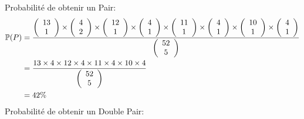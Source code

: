 Probabilité de obtenir un Pair:\\
\begin{align*}
    \mathbb{P}(P) &= \frac{{\left( \begin{array}{cc}13 \\ 1\end{array} \right)} \times {\left( \begin{array}{cc}4 \\ 2\end{array} \right)} \times {\left( \begin{array}{cc}12 \\ 1\end{array} \right)} \times {\left( \begin{array}{cc}4 \\ 1\end{array} \right)} \times {\left( \begin{array}{cc}11 \\ 1\end{array} \right)} \times {\left( \begin{array}{cc}4 \\ 1\end{array} \right)} \times {\left( \begin{array}{cc}10 \\ 1\end{array} \right)} \times {\left( \begin{array}{cc}4 \\ 1\end{array} \right)}}{{\left( \begin{array}{cc}52 \\ 5\end{array} \right)}}\\
    &= \frac{13 \times 4 \times 12 \times 4 \times 11 \times 4 \times 10 \times 4}{{\left( \begin{array}{cc}52 \\ 5\end{array} \right)}}\\
    &=42\%
\end{align*}
Probabilité de obtenir un Double Pair:\\
